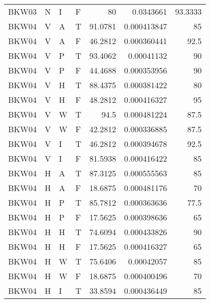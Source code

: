 \begin{longtable}{llllrrr}
    BKW03    & N         & I         & F          & 80         & 0.0343661   & 93.3333  \\
    BKW04    & V         & A         & T          & 91.0781    & 0.000413847 & 85       \\
    BKW04    & V         & A         & F          & 46.2812    & 0.000360441 & 92.5     \\
    BKW04    & V         & P         & T          & 93.4062    & 0.00041132  & 90       \\
    BKW04    & V         & P         & F          & 44.4688    & 0.000353956 & 90       \\
    BKW04    & V         & H         & T          & 88.4375    & 0.000381422 & 80       \\
    BKW04    & V         & H         & F          & 48.2812    & 0.000416327 & 95       \\
    BKW04    & V         & W         & T          & 94.5       & 0.000481224 & 87.5     \\
    BKW04    & V         & W         & F          & 42.2812    & 0.000336885 & 87.5     \\
    BKW04    & V         & I         & T          & 46.2812    & 0.000394678 & 92.5     \\
    BKW04    & V         & I         & F          & 81.5938    & 0.000416422 & 85       \\
    BKW04    & H         & A         & T          & 87.3125    & 0.000555563 & 85       \\
    BKW04    & H         & A         & F          & 18.6875    & 0.000481176 & 70       \\
    BKW04    & H         & P         & T          & 85.7812    & 0.000363636 & 77.5     \\
    BKW04    & H         & P         & F          & 17.5625    & 0.000398636 & 65       \\
    BKW04    & H         & H         & T          & 74.6094    & 0.000433826 & 90       \\
    BKW04    & H         & H         & F          & 17.5625    & 0.000416327 & 65       \\
    BKW04    & H         & W         & T          & 75.6406    & 0.00042057  & 85       \\
    BKW04    & H         & W         & F          & 18.6875    & 0.000400496 & 70       \\
    BKW04    & H         & I         & T          & 33.8594    & 0.000436449 & 85       \\

\end{longtable}
